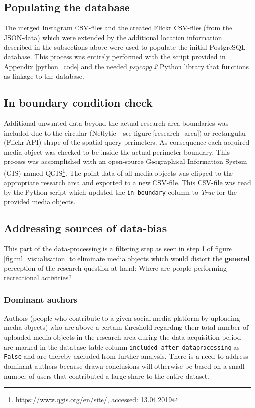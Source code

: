 \subsection{Populating the database} \label{populate_db}
The merged Instagram CSV-files and the created Flickr CSV-files (from the JSON-data) which were extended by the additional location information described in the subsections above were used to populate the initial PostgreSQL database. This process was entirely performed with the script provided in Appendix \ref{python_code} and the needed \textit{psycopg 2} Python library that functions as linkage to the database.

\subsection{In boundary condition check} \label{in_boundary}
Additional unwanted data beyond the actual research area boundaries was included due to the circular (Netlytic - see figure \ref{research_area}) or rectangular (Flickr API) shape of the spatial query perimeters. As consequence each acquired media object was checked to be inside the actual perimeter boundary. This process was accomplished with an open-source Geographical Information System (GIS) named QGIS\footnote{https://www.qgis.org/en/site/, accessed: 13.04.2019}. The point data of all media objects was clipped to the appropriate research area and exported to a new CSV-file. This CSV-file was read by the Python script which updated the \texttt{in\_boundary} column to \textit{True} for the provided media objects.

\subsection{Addressing sources of data-bias} \label{sources_data_bias}
This part of the data-processing is a filtering step as seen in step 1 of figure \ref{fig:ml_visualisation} to eliminate media objects which would distort the \textbf{general} perception of the research question at hand: Where are people performing recreational activities?

\subsubsection{Dominant authors} \label{bias_dominant_authors}
Authors (people who contribute to a given social media platform by uploading media objects) who are above a certain threshold regarding their total number of uploaded media objects in the research area during the data-acquisition period are marked in the database table column \texttt{included\_after\_dataprocessing} as \texttt{False} and are thereby excluded from further analysis. There is a need to address dominant authors because drawn conclusions will otherwise be based on a small number of users that contributed a large share to the entire dataset.\\

